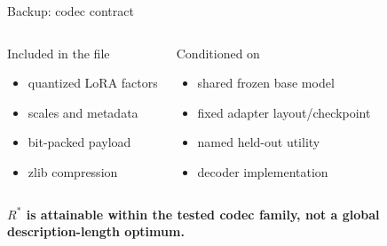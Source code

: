 \documentclass[aspectratio=169,10pt]{beamer}
\begin{document}
\begin{frame}{Backup: codec contract}
\begin{columns}[T,onlytextwidth]
\begin{block}{Included in the file}
\small
\begin{itemize}
  \item quantized LoRA factors
  \item scales and metadata
  \item bit-packed payload
  \item zlib compression
\end{itemize}
\end{block}
\begin{block}{Conditioned on}
\small
\begin{itemize}
  \item shared frozen base model
  \item fixed adapter layout/checkpoint
  \item named held-out utility
  \item decoder implementation
\end{itemize}
\end{block}
\end{columns}
\vfill
\begin{center}\bfseries $R^*$ is attainable within the tested codec family, not a global description-length optimum.\end{center}
\end{frame}
\end{document}
